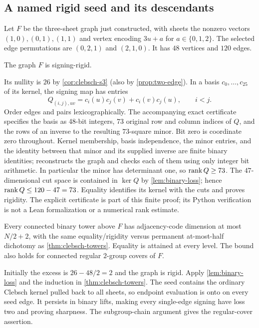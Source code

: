 \subsection{A named rigid seed and its descendants}
Let $F$ be the three-sheet graph just constructed, with sheets the
nonzero vectors $(1,0),(0,1),(1,1)$ and vertex encoding $3u+a$ for
$a\in\{0,1,2\}$. The selected edge permutations are $(0,2,1)$ and
$(2,1,0)$. It has $48$ vertices and $120$ edges.

\begin{lemma}\label{lem:seed-rigid}
\notformalized
The graph $F$ is signing-rigid.
\end{lemma}
\begin{informalproof}
Its nullity is $26$ by \cref{cor:clebsch-s3} (also by
\cref{prop:two-edge}). In a basis $c_0,\ldots,c_{25}$ of its
kernel, the signing map has entries
\[
 Q_{(i,j),uv}=c_i(u)c_j(v)+c_i(v)c_j(u),\qquad i<j.
\]
Order edges and pairs lexicographically. The accompanying exact
certificate  specifies
the basis as 48-bit integers, 73 original row and column indices
of $Q$, and the rows of an inverse to the resulting $73$-square
minor. Bit zero is coordinate zero throughout. Kernel membership,
basis independence, the minor entries, and the identity between
that minor and its supplied inverse are finite binary identities;
 reconstructs the graph and
checks each of them using only integer bit arithmetic.
In particular the minor has determinant one, so $\operatorname{rank} Q\ge73$.
The $47$-dimensional cut space is contained in $\ker Q$ by
\cref{lem:binary-loss}; hence $\operatorname{rank} Q\le120-47=73$.
Equality identifies its kernel with the cuts and proves rigidity.
The explicit certificate is part of this finite proof; its Python
verification is not a Lean formalization or a numerical rank estimate.
\end{informalproof}

\begin{corollary}\label{cor:seed-tower}
\notformalized
Every connected binary tower above $F$ has adjacency-code dimension
at most $N/2+2$, with the same equality/rigidity versus permanent
at-most-half dichotomy as \cref{thm:clebsch-towers}. Equality is
attained at every level. The bound also holds for connected regular
$2$-group covers of $F$.
\end{corollary}
\begin{informalproof}
Initially the excess is $26-48/2=2$ and the graph is rigid.
Apply \cref{lem:binary-loss} and the induction in
\cref{thm:clebsch-towers}. The seed contains the ordinary Clebsch
kernel pulled back to all sheets, so endpoint evaluation is onto
on every seed edge. It persists in binary lifts, making every
single-edge signing have loss two and proving sharpness.
The subgroup-chain argument gives the regular-cover assertion.
\end{informalproof}

